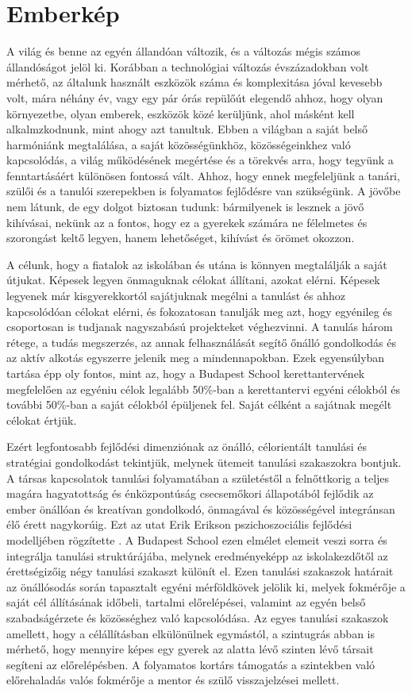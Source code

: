 \section{Emberkép}
\label{sec:gyerekkep}

A világ és benne az egyén állandóan változik, és a változás mégis számos
állandóságot jelöl ki. Korábban a technológiai változás évszázadokban volt
mérhető, az általunk használt eszközök száma és komplexitása jóval kevesebb
volt, mára
néhány év, vagy egy pár órás repülőút elegendő ahhoz, hogy olyan környezetbe,
olyan emberek, eszközök közé kerüljünk, ahol másként kell alkalmzkodnunk, mint
ahogy azt tanultuk. Ebben a világban a saját belső harmóniánk megtalálása, a
saját közösségünkhöz, közösségeinkhez való kapcsolódás, a világ működésének
megértése és a törekvés arra, hogy tegyünk a fenntartásáért különösen fontossá
vált. Ahhoz, hogy ennek megfeleljünk a tanári, szülői és a tanulói szerepekben
is folyamatos fejlődésre van szükségünk.
A jövőbe nem látunk, de egy dolgot biztosan tudunk: bármilyenek is lesznek a
jövő
kihívásai, nekünk az a fontos, hogy ez a gyerekek számára ne félelmetes és
szorongást keltő legyen, hanem lehetőséget, kihívást és örömet okozzon.

A célunk, hogy a fiatalok az iskolában és utána is könnyen megtalálják a saját
útjukat. Képesek legyen önmaguknak célokat állítani, azokat elérni. Képesek
legyenek már kisgyerekkortól sajátjuknak megélni a tanulást és ahhoz
kapcsolódóan célokat elérni, és fokozatosan tanulják meg azt, hogy egyénileg és
csoportosan is tudjanak nagyszabású projekteket véghezvinni.
A tanulás három rétege, a tudás megszerzés, az annak felhasználását segítő
őnálló gondolkodás és az aktív alkotás egyszerre jelenik meg a mindennapokban.
Ezek egyensúlyban tartása épp oly fontos, mint az, hogy a Budapest School
kerettantervének megfelelően az egyéniu célok legalább 50\%-ban a kerettantervi
egyéni célokból és további 50\%-ban a saját célokból épüljenek fel. Saját
célként a sajátnak megélt célokat értjük.

Ezért legfontosabb fejlődési dimenziónak az önálló, célorientált tanulási és
stratégiai gondolkodást tekintjük, melynek ütemeit tanulási szakaszokra
bontjuk. A társas kapcsolatok tanulási folyamatában a születéstől a
felnőttkorig a teljes magára hagyatottság és énközpontúság csecsemőkori
állapotából fejlődik az ember önállóan és kreatívan gondolkodó, önmagával és
közösségével integránsan élő érett nagykorúig. Ezt az utat Erik Erikson
pszichoszociális fejlődési modelljében rögzítette \citep{Erikson91}. A Budapest
School ezen elmélet elemeit veszi sorra és integrálja tanulási struktúrájába,
melynek eredményeképp az iskolakezdőtől az érettségizőig négy tanulási szakaszt
különít el. Ezen tanulási szakaszok határait az önállósodás során tapasztalt
egyéni mérföldkövek jelölik ki, melyek fokmérője a saját cél állításának
időbeli, tartalmi előrelépései, valamint az egyén belső szabadságérzete és
közösséghez való kapcsolódása.
Az egyes tanulási szakaszok amellett, hogy a célállításban elkülönülnek
egymástól, a szintugrás abban is mérhető, hogy mennyire képes egy gyerek az
alatta lévő szinten lévő társait segíteni az előrelépésben. A folyamatos
kortárs támogatás a szintekben való előrehaladás valós fokmérője a mentor és
szülő visszajelzései mellett.

